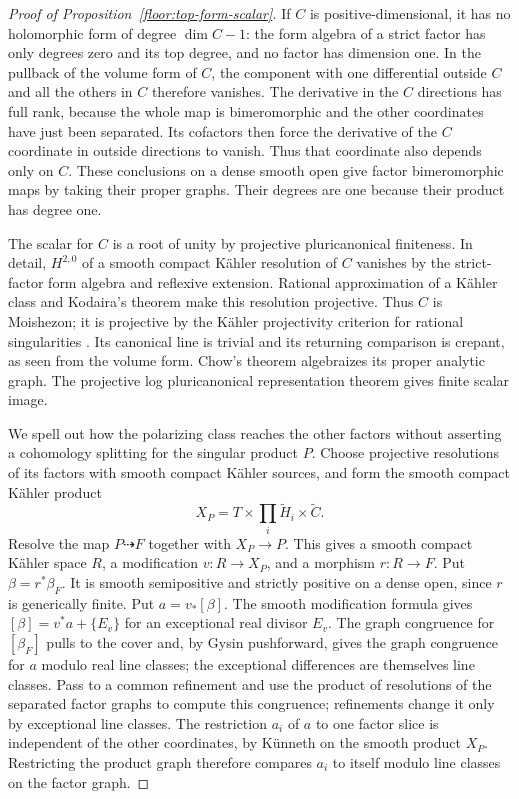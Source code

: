 \begin{proof}[Proof of Proposition~\ref{floor:top-form-scalar}]
If \(C\) is positive-dimensional, it has no holomorphic form of degree
\(\dim C-1\): the
form algebra of a strict factor has only degrees zero and its top degree,
and no factor has dimension one.  In the pullback of the volume form of
\(C\), the component with one differential outside \(C\) and all the
others in \(C\) therefore vanishes.  The derivative in the \(C\)
directions has full rank, because the whole map is bimeromorphic and the
other coordinates have just been separated.  Its cofactors then force the
derivative of the \(C\) coordinate in outside directions to vanish.
Thus that coordinate also depends only on \(C\).  These conclusions on a
dense smooth open give factor bimeromorphic maps by taking their proper
graphs.  Their degrees are one because their product has degree one.

The scalar for \(C\) is a root of unity by projective pluricanonical
finiteness.  In detail, \(H^{2,0}\) of a smooth compact K\"ahler
resolution of \(C\) vanishes by the strict-factor form algebra and
reflexive extension.  Rational approximation of a K\"ahler class and
Kodaira's theorem make this resolution projective.  Thus \(C\) is
Moishezon; it is projective by the K\"ahler projectivity criterion for
rational singularities \cite[Corollary~6']{Namikawa2002}.  Its canonical
line is trivial and its returning comparison is crepant, as seen from the
volume form.  Chow's theorem algebraizes its proper analytic graph.  The
projective log pluricanonical representation theorem
\cite[Theorem~1.1]{FujinoGongyo2014} gives finite scalar image.

We spell out how the polarizing class reaches the other factors without
asserting a cohomology splitting for the singular product \(P\).  Choose
projective resolutions of its factors with smooth compact K\"ahler sources,
and form the smooth compact
K\"ahler product
\[
 X_P=T\times\prod_i\widetilde H_i\times\widetilde C.
\]
Resolve the map \(P\dashrightarrow F\) together with \(X_P\to P\).  This
gives a smooth compact K\"ahler space \(R\), a modification \(v:R\to X_P\),
and a morphism \(r:R\to F\).  Put \(\beta=r^*\beta_F\).  It is smooth
semipositive and strictly positive on a dense open, since \(r\) is
generically finite.  Put \(a=v_*[\beta]\).  The smooth
modification formula gives \([\beta]=v^*a+\{E_v\}\) for an exceptional real
divisor \(E_v\).  The graph congruence for \([\beta_F]\) pulls to the cover and,
by Gysin pushforward, gives the graph congruence for \(a\) modulo real
line classes; the exceptional differences are themselves line classes.
Pass to a common refinement and use the product of resolutions of the
separated factor graphs to compute this congruence; refinements change it
only by exceptional line classes.  The restriction \(a_i\) of \(a\) to one factor slice
is independent of the other coordinates, by K\"unneth on the smooth
product \(X_P\).  Restricting the product graph therefore compares
\(a_i\) to itself modulo line classes on the factor graph.


\end{proof}
